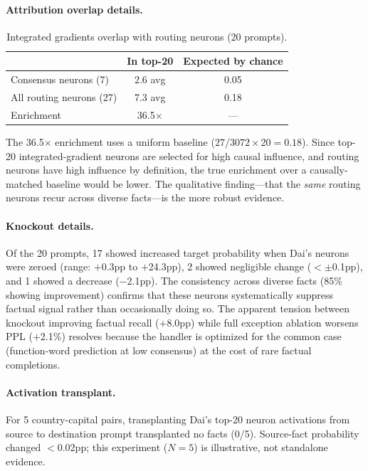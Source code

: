 \documentclass{article}
\begin{document}
\paragraph{Attribution overlap details.}
\begin{table}[h]
\centering
\caption{Integrated gradients overlap with routing neurons (20 prompts).}
\begin{tabular}{@{}lcc@{}}
\toprule
& In top-20 & Expected by chance \\
\midrule
Consensus neurons (7) & 2.6 avg & 0.05 \\
All routing neurons (27) & 7.3 avg & 0.18 \\
Enrichment & 36.5$\times$ & --- \\
\bottomrule
\end{tabular}
\end{table}

The 36.5$\times$ enrichment uses a uniform baseline ($27/3072 \times 20 = 0.18$).
Since top-20 integrated-gradient neurons are selected for high causal influence,
and routing neurons have high influence by definition, the true enrichment over
a causally-matched baseline would be lower.
The qualitative finding---that the \emph{same} routing neurons recur across
diverse facts---is the more robust evidence.

\paragraph{Knockout details.}
Of the 20 prompts, 17 showed increased target probability when Dai's neurons
were zeroed (range: $+$0.3pp to $+$24.3pp), 2 showed negligible change
($< \pm$0.1pp), and 1 showed a decrease ($-$2.1pp).
The consistency across diverse facts (85\% showing improvement) confirms
that these neurons systematically suppress factual signal rather than
occasionally doing so.
The apparent tension between knockout improving factual recall ($+$8.0pp) while
full exception ablation worsens PPL ($+$2.1\%) resolves because the handler
is optimized for the common case (function-word prediction at low consensus)
at the cost of rare factual completions.

\paragraph{Activation transplant.}
For 5 country-capital pairs, transplanting Dai's top-20 neuron activations from
source to destination prompt transplanted no facts (0/5).
Source-fact probability changed $<$0.02pp; this experiment ($N = 5$) is
illustrative, not standalone evidence.
\end{document}
